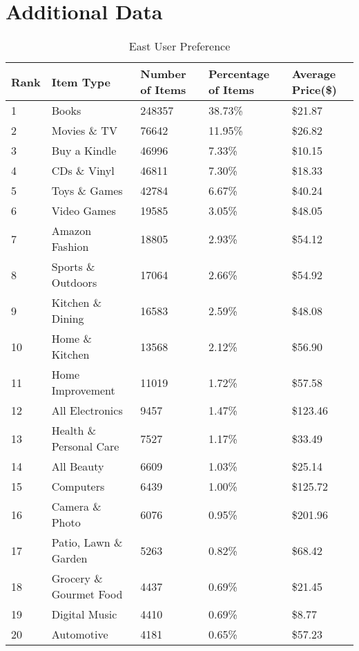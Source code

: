 \section{Additional Data}
\begin{table}[!ht]
\centering
\caption{East User Preference}
\begin{adjustbox}{max width=.5\textwidth}
\begin{tabular}{lllll}
Rank & Item Type          & Number of Items & Percentage of Items & Average Price(\$) \\ \hline
1 & Books & 248357 & 38.73\% & \$21.87 \\
2 & Movies \& TV & 76642 & 11.95\% & \$26.82 \\
3 & Buy a Kindle & 46996 & 7.33\% & \$10.15 \\
4 & CDs \& Vinyl & 46811 & 7.30\% & \$18.33 \\
5 & Toys \& Games & 42784 & 6.67\% & \$40.24 \\
6 & Video Games & 19585 & 3.05\% & \$48.05 \\
7 & Amazon Fashion & 18805 & 2.93\% & \$54.12 \\
8 & Sports \& Outdoors & 17064 & 2.66\% & \$54.92 \\
9 & Kitchen \& Dining & 16583 & 2.59\% & \$48.08 \\
10 & Home \& Kitchen & 13568 & 2.12\% & \$56.90 \\
11 & Home Improvement & 11019 & 1.72\% & \$57.58 \\
12 & All Electronics & 9457 & 1.47\% & \$123.46 \\
13 & Health \& Personal Care & 7527 & 1.17\% & \$33.49 \\
14 & All Beauty & 6609 & 1.03\% & \$25.14 \\
15 & Computers & 6439 & 1.00\% & \$125.72 \\
16 & Camera \& Photo & 6076 & 0.95\% & \$201.96 \\
17 & Patio, Lawn \& Garden & 5263 & 0.82\% & \$68.42 \\
18 & Grocery \& Gourmet Food & 4437 & 0.69\% & \$21.45 \\
19 & Digital Music & 4410 & 0.69\% & \$8.77 \\
20 & Automotive & 4181 & 0.65\% & \$57.23 \\
\end{tabular}
\end{adjustbox}
\end{table}



